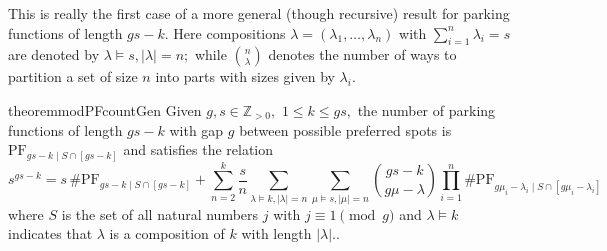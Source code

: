 \documentclass[12 pt]{amsart}
\theoremstyle{definition} %
\theoremstyle{remark} %
\begin{document}
This is really the first case of a more general (though recursive) result for parking functions of length $gs - k$. Here compositions $\lambda = (\lambda_{1}, \dots, \lambda_{n})$ with $\sum_{i = 1}^{n} \lambda_{i} = s$ are denoted by $\lambda\vDash s, \lvert\lambda\rvert = n;$ while $\binom{n}{\lambda}$ denotes the number of ways to partition a set of size $n$ into parts with sizes given by $\lambda_i$.

\begin{restatable}{theorem}{modPFcountGen}
	Given $g,s\in\mathbb{Z}_{>0},$ $1\le k\le gs,$ the number of parking functions of length $gs - k$ with gap $g$ between possible preferred spots is $\mathrm{PF}_{gs - k \mid S \cap [gs - k]}$ and satisfies the relation
	\[
		s^{gs - k} = s \, \# \mathrm{PF}_{gs - k \mid S \cap [gs - k]} + \sum_{n = 2}^{k} \frac{s}{n} \sum_{\lambda \vDash k, \lvert \lambda \rvert = n} \sum_{\mu \vDash s, \lvert \mu \rvert = n} \binom{gs - k}{g \mu - \lambda} \prod_{i = 1}^{n} \# \mathrm{PF}_{g \mu_{i} - \lambda_{i} \mid S \cap [g \mu_{i} - \lambda_{i}]}
	\]
	where $S$ is the set of all natural numbers $j$ with $j \equiv 1 \pmod g$ and $\lambda \vDash k$ indicates that $\lambda$ is a composition of $k$ with length $|\lambda|.$.
\end{restatable}
\end{document}
